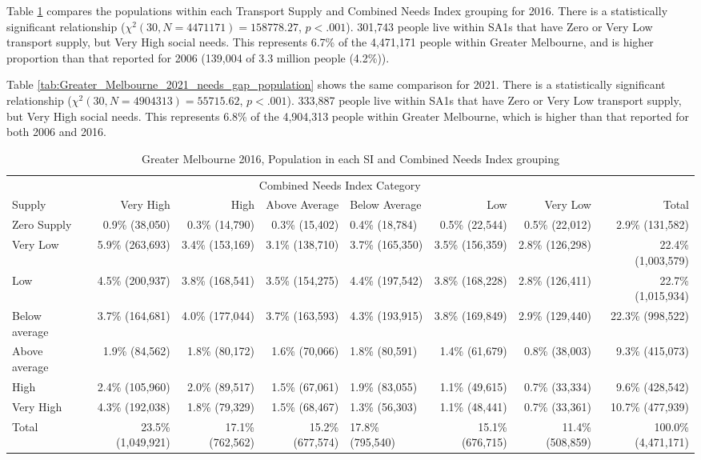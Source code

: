 \documentclass[preprint, 3p,
authoryear]{elsarticle} %
\begin{document}
Table \ref{tab:Greater_Melbourne_2016_needs_gap_population} compares the
populations within each Transport Supply and Combined Needs Index
grouping for 2016. There is a statistically significant relationship
(\(\chi^2(30, N = 4471171) = 158778.27\), \(p < .001\)). 301,743 people
live within SA1s that have Zero or Very Low transport supply, but Very
High social needs. This represents 6.7\% of the 4,471,171 people within
Greater Melbourne, and is higher proportion than that reported for 2006
(139,004 of 3.3 million people (4.2\%)).

Table \ref{tab:Greater_Melbourne_2021_needs_gap_population} shows the
same comparison for 2021. There is a statistically significant
relationship (\(\chi^2(30, N = 4904313) = 55715.62\), \(p < .001\)).
333,887 people live within SA1s that have Zero or Very Low transport
supply, but Very High social needs. This represents 6.8\% of the
4,904,313 people within Greater Melbourne, which is higher than that
reported for both 2006 and 2016.

\begin{table}

\caption{\label{tab:Greater_Melbourne_2016_needs_gap_population}Greater Melbourne 2016, Population in each SI and Combined Needs Index grouping}
\centering
\fontsize{6}{8}\selectfont
\begin{tabular}[t]{l|r|r|r|l|r|r|r}
\hline
\multicolumn{1}{c|}{ } & \multicolumn{6}{c|}{Combined Needs Index Category} & \multicolumn{1}{c}{ } \\
\cline{2-7}
Supply & Very High & High & Above Average & Below Average & Low & Very Low & Total\\
\hline
Zero Supply & 0.9\%    (38,050) & 0.3\%  (14,790) & 0.3\%  (15,402) & 0.4\%  (18,784) & 0.5\%  (22,544) & 0.5\%  (22,012) & 2.9\%   (131,582)\\
\hline
Very Low & 5.9\%   (263,693) & 3.4\% (153,169) & 3.1\% (138,710) & 3.7\% (165,350) & 3.5\% (156,359) & 2.8\% (126,298) & 22.4\% (1,003,579)\\
\hline
Low & 4.5\%   (200,937) & 3.8\% (168,541) & 3.5\% (154,275) & 4.4\% (197,542) & 3.8\% (168,228) & 2.8\% (126,411) & 22.7\% (1,015,934)\\
\hline
Below average & 3.7\%   (164,681) & 4.0\% (177,044) & 3.7\% (163,593) & 4.3\% (193,915) & 3.8\% (169,849) & 2.9\% (129,440) & 22.3\%   (998,522)\\
\hline
Above average & 1.9\%    (84,562) & 1.8\%  (80,172) & 1.6\%  (70,066) & 1.8\%  (80,591) & 1.4\%  (61,679) & 0.8\%  (38,003) & 9.3\%   (415,073)\\
\hline
High & 2.4\%   (105,960) & 2.0\%  (89,517) & 1.5\%  (67,061) & 1.9\%  (83,055) & 1.1\%  (49,615) & 0.7\%  (33,334) & 9.6\%   (428,542)\\
\hline
Very High & 4.3\%   (192,038) & 1.8\%  (79,329) & 1.5\%  (68,467) & 1.3\%  (56,303) & 1.1\%  (48,441) & 0.7\%  (33,361) & 10.7\%   (477,939)\\
\hline
Total & 23.5\% (1,049,921) & 17.1\% (762,562) & 15.2\% (677,574) & 17.8\% (795,540) & 15.1\% (676,715) & 11.4\% (508,859) & 100.0\% (4,471,171)\\
\hline
\end{tabular}
\end{table}
\end{document}
